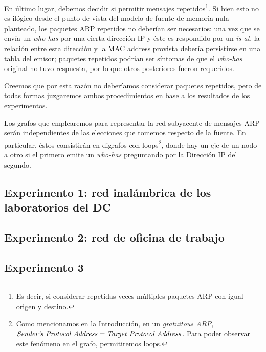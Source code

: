 \par En último lugar, debemos decidir si permitir mensajes repetidos\footnote{Es decir, si considerar repetidas veces múltiples paquetes ARP con igual origen y destino.}. 
Si bien esto no es ilógico desde el punto de vista del modelo de fuente de memoria nula planteado, los paquetes ARP repetidos no deberían ser necesarios: una vez que se envía un \textit{who-has} por una cierta dirección IP y éste es respondido por un \textit{is-at}, la relación entre esta dirección y la MAC address provista debería persistirse en una tabla del emisor; paquetes repetidos podrían ser síntomas de que el \textit{who-has} original no tuvo respuesta, por lo que otros posteriores fueron requeridos.

\par Creemos que por esta razón no deberíamos considerar paquetes repetidos, pero de todas formas juzgaremos ambos procedimientos en base a los resultados de los experimentos.

\par Los grafos que emplearemos para representar la red subyacente de mensajes ARP serán independientes de las elecciones que tomemos respecto de la fuente.
En particular, éstos consistirán en digrafos con loops\footnote{Como mencionamos en la Introducción, en un \textit{gratuitous ARP}, $\text{\textit{Sender's Protocol Address}} = \text{\textit{Target Protocol Address}}$. Para poder observar este fenómeno en el grafo, permitiremos loops.}, donde hay un eje de un nodo a otro si el primero emite un \textit{who-has} preguntando por la Dirección IP del segundo.
 
\newpage
\subsection{Experimento 1: red inalámbrica de los laboratorios del DC}


\newpage
\subsection{Experimento 2: red de oficina de trabajo}


\newpage
\subsection{Experimento 3}
